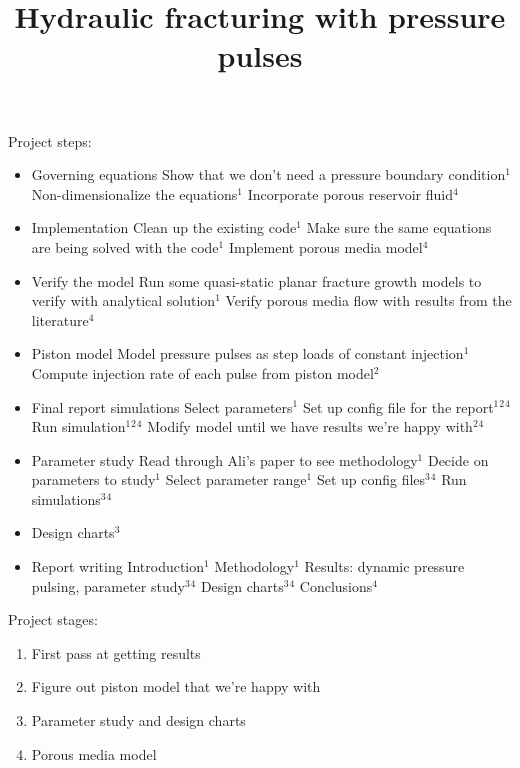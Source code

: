 \documentclass{article}
\begin{document}
	\title{Hydraulic fracturing with pressure pulses}
	\maketitle
Project steps:
\begin{itemize}
	\item Governing equations
		\subitem Show that we don't need a pressure boundary condition$^1$ \checkmark
		\subitem Non-dimensionalize the equations$^1$
		\subitem Incorporate porous reservoir fluid$^4$
	\item Implementation
		\subitem Clean up the existing code$^1$
		\subitem Make sure the same equations are being solved with the code$^1$
		\subitem Implement porous media model$^4$
	\item Verify the model
		\subitem Run some quasi-static planar fracture growth models to verify with analytical solution$^1$
		\subitem Verify porous media flow with results from the literature$^4$
	\item Piston model
		\subitem Model pressure pulses as step loads of constant injection$^1$
		\subitem Compute injection rate of each pulse from piston model$^2$
	\item Final report simulations
		\subitem Select parameters$^1$
		\subitem Set up config file for the report$^1$$^2$$^4$
		\subitem Run simulation$^1$$^2$$^4$
		\subitem Modify model until we have results we're happy with$^2$$^4$
	\item Parameter study
		\subitem Read through Ali's paper to see methodology$^1$
		\subitem Decide on parameters to study$^1$
		\subitem Select parameter range$^1$
		\subitem Set up config files$^3$$^4$
		\subitem Run simulations$^3$$^4$
	\item Design charts$^3$
	\item Report writing
		\subitem Introduction$^1$
		\subitem Methodology$^1$
		\subitem Results: dynamic pressure pulsing, parameter study$^3$$^4$
		\subitem Design charts$^3$$^4$
		\subitem Conclusions$^4$
\end{itemize}

Project stages: 
\begin{enumerate}
	\item First pass at getting results
	\item Figure out piston model that we're happy with
	\item Parameter study and design charts
	\item Porous media model
\end{enumerate}
\end{document}
